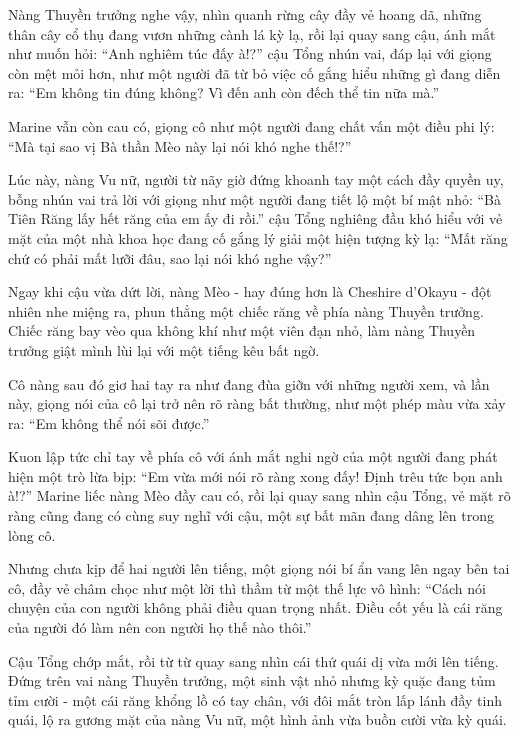 \documentclass[../main.tex]{subfiles}
\begin{document}
Nàng Thuyền trưởng nghe vậy, nhìn quanh rừng cây đầy vẻ hoang dã, những thân cây cổ thụ đang vươn những cành lá kỳ lạ, rồi lại quay sang cậu, ánh mắt như muốn hỏi: ``Anh nghiêm túc đấy à!?'' cậu Tổng nhún vai, đáp lại với giọng còn mệt mỏi hơn, như một người đã từ bỏ việc cố gắng hiểu những gì đang diễn ra: ``Em không tin đúng không? Vì đến anh còn đếch thể tin nữa mà.''

Marine vẫn còn cau có, giọng cô như một người đang chất vấn một điều phi lý: ``Mà tại sao vị Bà thần Mèo này lại nói khó nghe thế!?''

Lúc này, nàng Vu nữ, người từ nãy giờ đứng khoanh tay một cách đầy quyền uy, bỗng nhún vai trả lời với giọng như một người đang tiết lộ một bí mật nhỏ: ``Bà Tiên Răng lấy hết răng của em ấy đi rồi.'' cậu Tổng nghiêng đầu khó hiểu với vẻ mặt của một nhà khoa học đang cố gắng lý giải một hiện tượng kỳ lạ: ``Mất răng chứ có phải mất lưỡi đâu, sao lại nói khó nghe vậy?''

Ngay khi cậu vừa dứt lời, nàng Mèo - hay đúng hơn là Cheshire d'Okayu - đột nhiên nhe miệng ra, phun thẳng một chiếc răng về phía nàng Thuyền trưởng. Chiếc răng bay vèo qua không khí như một viên đạn nhỏ, làm nàng Thuyền trưởng giật mình lùi lại với một tiếng kêu bất ngờ.


Cô nàng sau đó giơ hai tay ra như đang đùa giỡn với những người xem, và lần này, giọng nói của cô lại trở nên rõ ràng bất thường, như một phép màu vừa xảy ra: ``Em không thể nói sõi được.''

Kuon lập tức chỉ tay về phía cô với ánh mắt nghi ngờ của một người đang phát hiện một trò lừa bịp: ``Em vừa mới nói rõ ràng xong đấy! Định trêu tức bọn anh à!?'' Marine liếc nàng Mèo đầy cau có, rồi lại quay sang nhìn cậu Tổng, vẻ mặt rõ ràng cũng đang có cùng suy nghĩ với cậu, một sự bất mãn đang dâng lên trong lòng cô.

Nhưng chưa kịp để hai người lên tiếng, một giọng nói bí ẩn vang lên ngay bên tai cô, đầy vẻ châm chọc như một lời thì thầm từ một thế lực vô hình: ``Cách nói chuyện của con người không phải điều quan trọng nhất. Điều cốt yếu là cái răng của người đó làm nên con người họ thế nào thôi.''


Cậu Tổng chớp mắt, rồi từ từ quay sang nhìn cái thứ quái dị vừa mới lên tiếng. Đứng trên vai nàng Thuyền trưởng, một sinh vật nhỏ nhưng kỳ quặc đang tủm tỉm cười - một cái răng khổng lồ có tay chân, với đôi mắt tròn lấp lánh đầy tinh quái, lộ ra gương mặt của nàng Vu nữ, một hình ảnh vừa buồn cười vừa kỳ quái.
\end{document}
